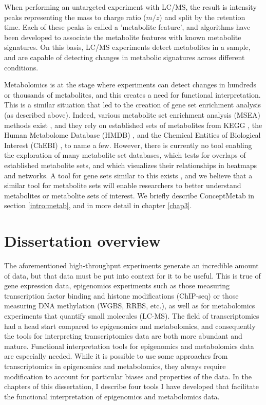 When performing an untargeted experiment with LC/MS, the result is intensity peaks representing the mass to charge ratio ($m/z$) and split by the retention time. Each of these peaks is called a 'metabolite feature', and algorithms have been developed to associate the metabolite features with known metabolite signatures. On this basis, LC/MS experiments detect metabolites in a sample, and are capable of detecting changes in metabolic signatures across different conditions.

Metabolomics is at the stage where experiments can detect changes in hundreds or thousands of metabolites, and this creates a need for functional interpretation. This is a similar situation that led to the creation of gene set enrichment analysis (as described above). Indeed, various metabolite set enrichment analysis (MSEA) methods exist \cite{Xia:2002gx, Xia:2010fv, Chagoyen:2011bl}, and they rely on established sets of metabolites from KEGG \cite{Kanehisa:2011fz}, the Human Metabolome Database (HMDB) \cite{Wishart:2012wa}, and the Chemical Entities of Biological Interest (ChEBI) \cite{Hastings:2012ww}, to name a few. However, there is currently no tool enabling the exploration of many metabolite set databases, which tests for overlaps of established metabolite sets, and which visualizes their relationships in heatmaps and networks. A tool for gene sets similar to this exists \cite{Sartor:2009fo}, and we believe that a similar tool for metabolite sets will enable researchers to better understand metabolites or metabolite sets of interest. We briefly describe ConceptMetab in section \ref{intro:metab}, and in more detail in chapter \ref{chap3}.

\section{Dissertation overview}

The aforementioned high-throughput experiments generate an incredible amount of data, but that data must be put into context for it to be useful. This is true of gene expression data, epigenomics experiments such as those measuring transcription factor binding and histone modifications (ChIP-seq) or those measuring DNA methylation (WGBS, RRBS, etc.), as well as for metabolomics experiments that quantify small molecules (LC-MS). The field of transcriptomics had a head start compared to epigenomics and metabolomics, and consequently the tools for interpreting transcriptomics data are both more abundant and mature. Functional interpretation tools for epigenomics and metabolomics data are especially needed. While it is possible to use some approaches from transcriptomics in epigenomics and metabolomics, they always require modification to account for particular biases and properties of the data. In the chapters of this dissertation, I describe four tools I have developed that facilitate the functional interpretation of epigenomics and metabolomics data.

